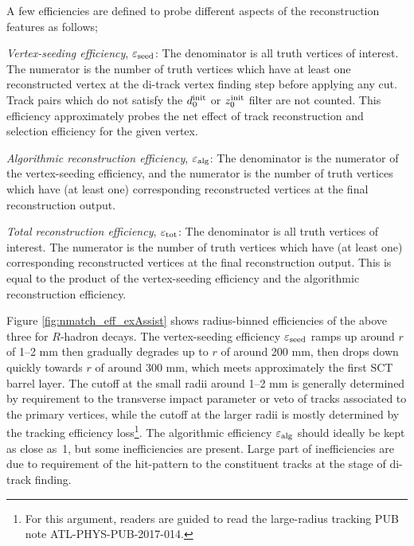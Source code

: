 \documentclass[NOTE, atlasdraft=true, texlive=2018, UKenglish]{\ATLASLATEXPATH atlasdoc}
\begin{document}
A few efficiencies are defined to probe different aspects of the reconstruction features as follows;
\begin{description}
\item{\emph{Vertex-seeding efficiency}, $\varepsilon_{\rm seed}$}: The denominator is all truth vertices of interest. The numerator is the number of truth vertices which have at least one reconstructed vertex at the di-track vertex finding step before applying any cut. Track pairs which do not satisfy the $d_{0}^{\rm init}$ or $z_{0}^{\rm init}$ filter are not counted. This efficiency approximately probes the net effect of track reconstruction and selection efficiency for the given vertex.

\item{\emph{Algorithmic reconstruction efficiency}, $\varepsilon_{\rm alg}$}: The denominator is the numerator of the vertex-seeding efficiency, and the numerator is the number of truth vertices which have (at least one) corresponding reconstructed vertices at the final reconstruction output.

\item{\emph{Total reconstruction efficiency}, $\varepsilon_{\rm tot}$}: The denominator is all truth vertices of interest. The numerator is the number of truth vertices which have (at least one) corresponding reconstructed vertices at the final reconstruction output. This is equal to the product of the vertex-seeding efficiency and the algorithmic reconstruction efficiency.
\end{description}

Figure \ref{fig:nmatch_eff_exAssist} shows radius-binned efficiencies of the above three for $R$-hadron decays. The vertex-seeding efficiency $\varepsilon_{\rm seed}$ ramps up around $r$ of 1--2 mm then gradually degrades up to $r$ of around 200 mm, then drops down quickly towards $r$ of around 300 mm, which meets approximately the first SCT barrel layer. The cutoff at the small radii around 1--2 mm is generally determined by requirement to the transverse impact parameter or veto of tracks associated to the primary vertices, while the cutoff at the larger radii is mostly determined by the tracking efficiency loss\footnote{For this argument, readers are guided to read the large-radius tracking PUB note ATL-PHYS-PUB-2017-014.}. The algorithmic efficiency $\varepsilon_{\rm alg}$ should ideally be kept as close as~1, but some inefficiencies are present. Large part of inefficiencies are due to requirement of the hit-pattern to the constituent tracks at the stage of di-track finding.
\end{document}
